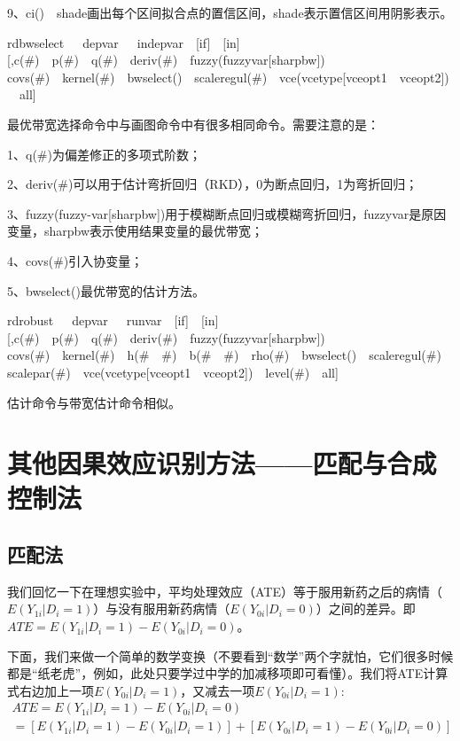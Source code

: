 \documentclass[cn,12pt,math=newtx,citestyle=gb7714-2015,bibstyle=gb7714-2015]{elegantbook}
\begin{document}
	9、ci()~~shade画出每个区间拟合点的置信区间，shade表示置信区间用阴影表示。
	
	rdbwselect~~~depvar~~~indepvar~~[if]~~[in][,c(\#)~~p(\#)~~q(\#)~~deriv(\#)~~fuzzy(fuzzyvar[sharpbw])~~\\
	covs(\#)~~kernel(\#)~~bwselect()~~scaleregul(\#)~~vce(vcetype[vceopt1~~vceopt2])~~all]
	
	最优带宽选择命令中与画图命令中有很多相同命令。需要注意的是：
	
	1、q(\#)为偏差修正的多项式阶数；
	
	2、deriv(\#)可以用于估计弯折回归（RKD），0为断点回归，1为弯折回归；
	
	3、fuzzy(fuzzy-var[sharpbw])用于模糊断点回归或模糊弯折回归，fuzzyvar是原因变量，sharpbw表示使用结果变量的最优带宽；
	
	4、covs(\#)引入协变量；
	
	5、bwselect()最优带宽的估计方法。
	
	rdrobust~~~depvar~~~runvar~~[if]~~[in][,c(\#)~~p(\#)~~q(\#)~~deriv(\#)~~fuzzy(fuzzyvar[sharpbw])~~\\
	covs(\#)~~kernel(\#)~~h(\#~~\#)~~b(\#~~\#)~~rho(\#)~~bwselect()~~scaleregul(\#)~~\\
	scalepar(\#)~~vce(vcetype[vceopt1~~vceopt2])~~level(\#)~~all]
	
	估计命令与带宽估计命令相似。
	
	
	\section{其他因果效应识别方法——匹配与合成控制法}
	
	\subsection{匹配法}
	
	我们回忆一下在理想实验中，平均处理效应（ATE）等于服用新药之后的病情（$E(Y_{1i}\big|D_i=1)$）与没有服用新药病情（$E(Y_{0i}\big|D_i=0)$）之间的差异。即
	$ATE=E(Y_{1i}\big|D_i=1)-E(Y_{0i}\big|D_i=0)$。
	
	下面，我们来做一个简单的数学变换（不要看到“数学”两个字就怕，它们很多时候都是“纸老虎”，例如，此处只要学过中学的加减移项即可看懂）。我们将ATE计算式右边加上一项$E(Y_{0i}\big|D_i=1)$，又减去一项$E(Y_{0i}\big|D_i=1)$:
	\begin{gather}
		ATE=E(Y_{1i}\big|D_i=1)-E(Y_{0i}\big|D_i=0)\nonumber\\
		=[E(Y_{1i}\big|D_i=1)-E(Y_{0i}\big|D_i=1)]+[E(Y_{0i}\big|D_i=1)-E(Y_{0i}\big|D_i=0)]
	\end{gather}
	
\end{document}
